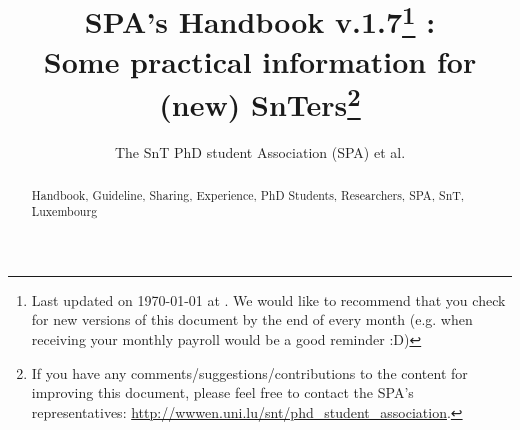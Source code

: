 \documentclass[runningheads,a4paper]{llncs}
\newcommand{\keywords}[1]{\par\addvspace\baselineskip
\noindent\keywordname\enspace\ignorespaces#1}
\newcommand{\SAPcv}{1.7}
\begin{document}
\mainmatter  %

\title{SPA's Handbook v.\SAPcv\thanks{Last updated on \ukvardate\today\xspace at \currenttime.
We would like to recommend that you check for new versions of this document by the end of every month (e.g. when receiving your monthly payroll would be a good reminder :D)} : \\
Some practical information for (new) SnTers\thanks{If you have any comments/suggestions/contributions to the content for improving this document, please feel free to contact the SPA's representatives: \url{http://wwwen.uni.lu/snt/phd_student_association}.}}


\author{The SnT PhD student Association (SPA) et al.
}
%

\maketitle

\begin{abstract}


\keywords{Handbook, Guideline, Sharing, Experience, PhD Students, Researchers, SPA, SnT, Luxembourg}
\end{abstract}

\setcounter{secnumdepth}{2}
\setcounter{tocdepth}{2}
\begin{spacing}{1.3}
\tableofcontents
\end{spacing}

\newpage
\end{document}
